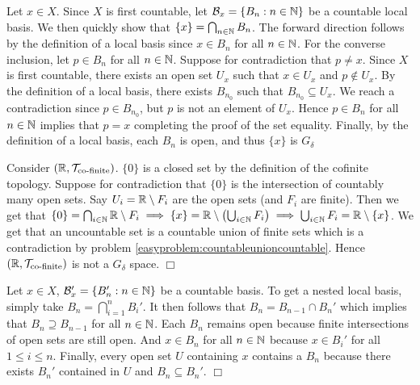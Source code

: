 \documentclass{article}
\begin{document}
 {
    Let $x\in X$. Since $X$ is first countable, let $\mathcal{B}_{x} = \{B_{n}: n\in \mathbb{N}\}$ be a countable local basis. We then quickly show that $\{x\} = \bigcap_{n\in \mathbb{N}} B_{n}$. The forward direction follows by the definition of a local basis since $x\in B_{n}$ for all $n\in \mathbb{N}$. For the converse inclusion, let $p\in B_{n}$ for all $n\in \mathbb{N}$. Suppose for contradiction that $p\neq x$. Since $X$ is first countable, there exists an open set $U_{x}$ such that $x\in U_{x}$ and $p\not\in U_{x}$. By the definition of a local basis, there exists $B_{n_{0}}$ such that $B_{n_{0}}\subseteq U_{x}$. We reach a contradiction since $p\in B_{n_{0}}$, but $p$ is not an element of $U_{x}$. Hence $p \in B_{n}$ for all $n\in \mathbb{N}$ implies that $p = x$ completing the proof of the set equality. Finally, by the definition of a local basis, each $B_{n}$ is open, and thus $\{x\}$ is $G_{\delta}$
}

 {
    Consider $(\mathbb{R}, \mathcal{T}_{\text{co-finite}})$. $\{0\}$ is a closed set by the definition of the cofinite topology. Suppose for contradiction that $\{0\}$ is the intersection of countably many open sets. Say $U_{i} = \mathbb{R}\setminus F_{i}$ are the open sets (and $F_{i}$ are finite). Then we get that $\{0\} = \bigcap_{i\in \mathbb{N}} \mathbb{R}\setminus F_{i} \implies \{x\} = \mathbb{R}\setminus\left(\bigcup_{i\in \mathbb{N}} F_{i}\right) \implies \bigcup_{i\in \mathbb{N}} F_{i} = \mathbb{R}\setminus\{x\}$. We get that an uncountable set is a countable union of finite sets which is a contradiction by problem \ref{easyproblem:countableunioncountable}. Hence $(\mathbb{R}, \mathcal{T}_{\text{co-finite}})$ is not a $G_{\delta}$ space. $\Box$
}

 {
    Let $x\in X$, $\mathcal{B}_{x}' = \{B_{n}': n\in \mathbb{N}\}$ be a countable basis. To get a nested local basis, simply take $B_{n} = \bigcap_{i = 1}^{n}B_{i}'$. It then follows that $B_{n} = B_{n-1}\cap B_{n}'$ which implies that $B_{n}\supseteq B_{n-1}$ for all $n\in \mathbb{N}$. Each $B_{n}$ remains open because finite intersections of open sets are still open. And $x\in B_{n}$ for all $n\in \mathbb{N}$ because $x\in B_{i}'$ for all $1\leq i \leq n$. Finally, every open set $U$ containing $x$ contains a $B_{n}$ because there exists $B_{n}'$ contained in $U$ and $B_{n}\subseteq B_{n}'$. $\Box$
}
\end{document}
